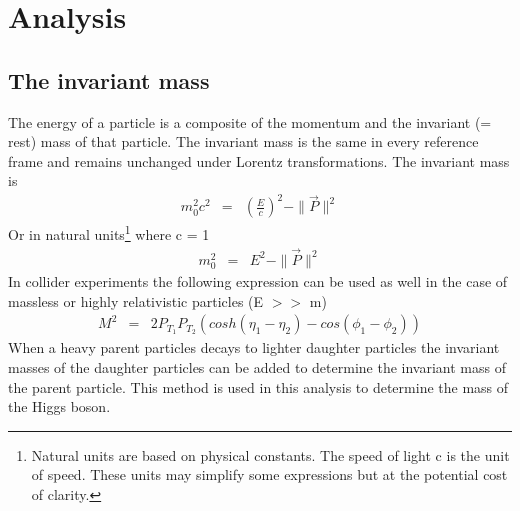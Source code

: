 \documentclass[a4paper,12pt]{article}
\begin{document}
\section{Analysis}
\subsection{The invariant mass}
The energy of a particle is a composite of the momentum and the invariant (= rest) mass of that particle. The invariant mass is the same in every reference frame and remains unchanged under Lorentz transformations. The invariant mass is
\begin{eqnarray}
	m_0^2 c^2 &=& \left (\frac{E}{c}\right)^2 - \|\vec{P}\|^2
	\label{eq:invmass1}
\end{eqnarray}
Or in natural units\footnote{Natural units are based on physical constants. The speed of light c is the unit of speed. These units may simplify some expressions but at the potential cost of clarity.} where c = 1
\begin{eqnarray}
	m_0^2 &=& E^2-\|\vec{P}\|^2
\end{eqnarray}
In collider experiments the following expression can be used as well in the case of massless or highly relativistic particles (E $>>$ m)
\begin{eqnarray}
	M^2 &=& 2P_{T_1}P_{T_2}(cosh(\eta_1 - \eta_2) - cos(\phi_1 - \phi_2))
	\label{eq:invmass2}
\end{eqnarray}
When a heavy parent particles decays to lighter daughter particles the invariant masses of the daughter particles can be added to determine the invariant mass of the parent particle. This method is used in this analysis to determine the mass of the Higgs boson.
\end{document}
